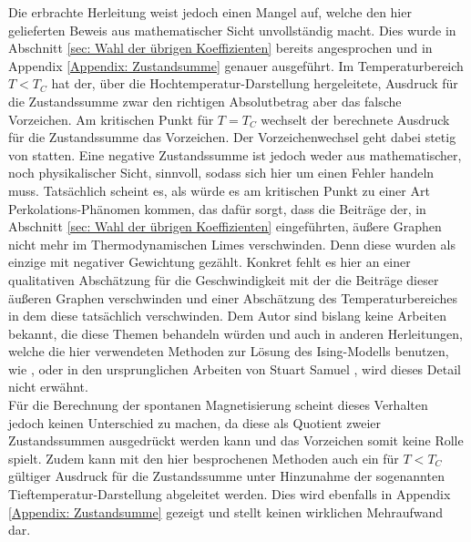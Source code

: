 \noindent Die erbrachte Herleitung weist jedoch einen Mangel auf, welche den hier gelieferten Beweis aus mathematischer Sicht unvollständig macht. Dies wurde in Abschnitt \ref{sec: Wahl der übrigen Koeffizienten} bereits angesprochen und in Appendix \ref{Appendix: Zustandsumme} genauer ausgeführt. Im Temperaturbereich $T < T_C$ hat der, über die Hochtemperatur-Darstellung hergeleitete, Ausdruck für die Zustandssumme zwar den richtigen Absolutbetrag aber das falsche Vorzeichen. Am kritischen Punkt für $T = T_C$ wechselt der berechnete Ausdruck für die Zustandssumme das Vorzeichen. Der Vorzeichenwechsel geht dabei stetig von statten. Eine negative Zustandssumme ist jedoch weder aus mathematischer, noch physikalischer Sicht, sinnvoll, sodass sich hier um einen Fehler handeln muss. Tatsächlich scheint es, als würde es am kritischen Punkt zu einer Art Perkolations-Phänomen kommen, das dafür sorgt, dass die Beiträge der, in Abschnitt \ref{sec: Wahl der übrigen Koeffizienten} eingeführten, äußere Graphen nicht mehr im Thermodynamischen Limes verschwinden. Denn diese wurden als einzige mit negativer Gewichtung gezählt. Konkret fehlt es hier an einer qualitativen Abschätzung für die Geschwindigkeit mit der die Beiträge dieser äußeren Graphen verschwinden und einer Abschätzung des Temperaturbereiches in dem diese tatsächlich verschwinden. Dem Autor sind bislang keine Arbeiten bekannt, die diese Themen behandeln würden und auch in anderen Herleitungen, welche die hier verwendeten Methoden zur Lösung des Ising-Modells benutzen, wie \cite{PostBac} \cite{Gandhi}, oder in den ursprunglichen Arbeiten von Stuart Samuel \cite{StuartSamuel1} \cite{StuartSamuel2}, wird dieses Detail nicht erwähnt. \\
Für die Berechnung der spontanen Magnetisierung scheint dieses Verhalten jedoch keinen Unterschied zu machen, da diese als Quotient zweier Zustandssummen ausgedrückt werden kann und das Vorzeichen somit keine Rolle spielt. Zudem kann mit den hier besprochenen Methoden auch ein für $T < T_C$ gültiger Ausdruck für die Zustandssumme unter Hinzunahme der sogenannten Tieftemperatur-Darstellung abgeleitet werden. Dies wird ebenfalls in Appendix \ref{Appendix: Zustandsumme} gezeigt und stellt keinen wirklichen Mehraufwand dar. 

